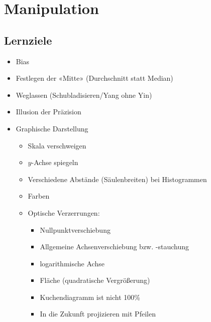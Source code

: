 
\section{Manipulation}

\subsection*{Lernziele}

\begin{itemize}
\item Bias 
\item Festlegen der «Mitte» (Durchschnitt statt Median) 
\item Weglassen (Schubladisieren/Yang ohne Yin)
\item Illusion der Präzision
\item Graphische Darstellung 
  \begin{itemize}
  \item Skala verschweigen
  \item $y$-Achse spiegeln
  \item Verschiedene Abstände (Säulenbreiten) bei Histogrammen
  \item Farben
  \item Optische Verzerrungen:
    \begin{itemize}
    \item Nullpunktverschiebung
    \item Allgemeine Achsenverschiebung bzw. -stauchung
    \item logarithmische Achse
    \item Fläche (quadratische Vergrößerung)
    \item Kuchendiagramm ist nicht 100\%
    \item In die Zukunft projizieren mit Pfeilen
    \end{itemize}
  \end{itemize}
\end{itemize}

